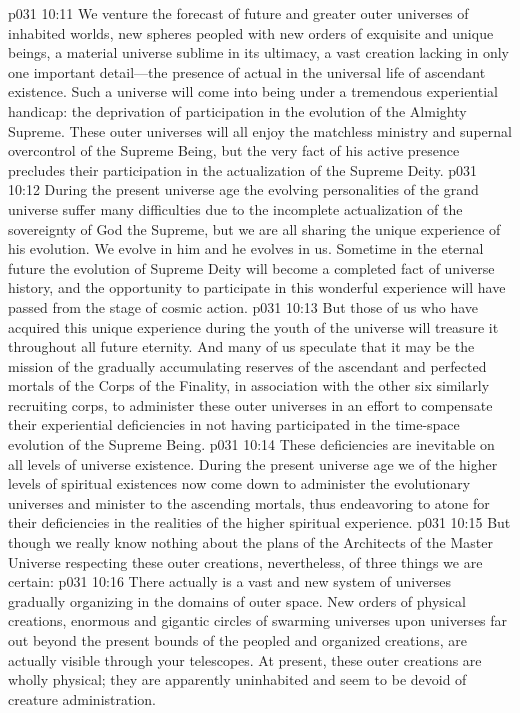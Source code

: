 \vs p031 10:11 We venture the forecast of future and greater outer universes of inhabited worlds, new spheres peopled with new orders of exquisite and unique beings, a material universe sublime in its ultimacy, a vast creation lacking in only one important detail---the presence of actual  in the universal life of ascendant existence. Such a universe will come into being under a tremendous experiential handicap: the deprivation of participation in the evolution of the Almighty Supreme. These outer universes will all enjoy the matchless ministry and supernal overcontrol of the Supreme Being, but the very fact of his active presence precludes their participation in the actualization of the Supreme Deity.
\vs p031 10:12 During the present universe age the evolving personalities of the grand universe suffer many difficulties due to the incomplete actualization of the sovereignty of God the Supreme, but we are all sharing the unique experience of his evolution. We evolve in him and he evolves in us. Sometime in the eternal future the evolution of Supreme Deity will become a completed fact of universe history, and the opportunity to participate in this wonderful experience will have passed from the stage of cosmic action.
\vs p031 10:13 But those of us who have acquired this unique experience during the youth of the universe will treasure it throughout all future eternity. And many of us speculate that it may be the mission of the gradually accumulating reserves of the ascendant and perfected mortals of the Corps of the Finality, in association with the other six similarly recruiting corps, to administer these outer universes in an effort to compensate their experiential deficiencies in not having participated in the time\hyp{}space evolution of the Supreme Being.
\vs p031 10:14 These deficiencies are inevitable on all levels of universe existence. During the present universe age we of the higher levels of spiritual existences now come down to administer the evolutionary universes and minister to the ascending mortals, thus endeavoring to atone for their deficiencies in the realities of the higher spiritual experience.
\vs p031 10:15 But though we really know nothing about the plans of the Architects of the Master Universe respecting these outer creations, nevertheless, of three things we are certain:
\pc \vs p031 10:16 \bibnobreakspace There actually is a vast and new system of universes gradually organizing in the domains of outer space. New orders of physical creations, enormous and gigantic circles of swarming universes upon universes far out beyond the present bounds of the peopled and organized creations, are actually visible through your telescopes. At present, these outer creations are wholly physical; they are apparently uninhabited and seem to be devoid of creature administration.

